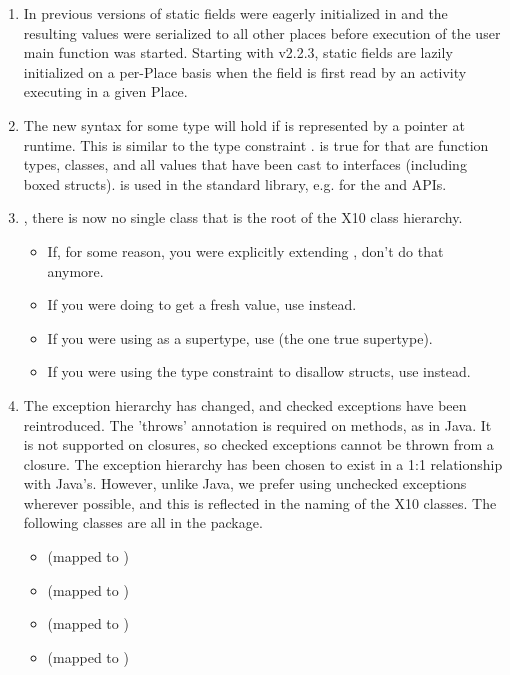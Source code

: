 \begin{enumerate}

\item In previous versions of \Xten{} static fields were
  eagerly initialized in  and the resulting values were
  serialized to all other places before execution of the user main
  function was started. Starting with \Xten{} v2.2.3, static fields are
  lazily initialized on a per-Place basis when the field is first read
  by an activity executing in a given Place.

\item The new syntax  for some type  will hold if
   is represented by a pointer at runtime.  This is similar to
  the type constraint .   is true for
   that are function types, classes, and all values that have
  been cast to interfaces (including boxed structs).   is used
  in the standard library, e.g. for the  and
   APIs.

\item {}, there is now no single class that
  is the root of the X10 class hierarchy.
\begin{itemize}
  \item If, for some reason, you were explicitly extending , don't do
    that anymore.
  \item If you were doing  to get a fresh value, use
     instead.
  \item If you were using  as a supertype, use 
    (the one true supertype).  
  \item If you were using the type constraint  to
    disallow structs, use  instead.
\end{itemize}

\item The exception hierarchy has changed, and checked exceptions have
  been reintroduced.  The 'throws' annotation is required on methods,
  as in Java.  It is not supported on closures, so checked exceptions
  cannot be thrown from a closure.  The exception hierarchy has been
  chosen to exist in a 1:1 relationship with Java's.  However, unlike
  Java, we prefer using unchecked exceptions wherever possible, and
  this is reflected in the naming of the X10 classes.  The following
  classes are all in the  package.
  \begin{itemize}
  \item {} (mapped to ) 
  \item {} (mapped to ) 
  \item {}  (mapped to ) 
  \item {}  (mapped to ) 
  \end{itemize}


\end{enumerate}
